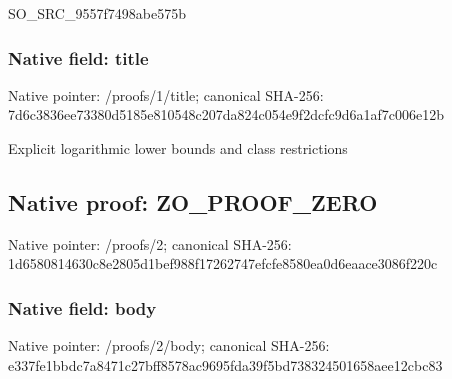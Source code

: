 \documentclass[10pt,a4paper]{article}
\begin{document}
\begingroup\raggedright\sloppy SO\_\allowbreak{}SRC\_\allowbreak{}9557f7498abe575b\par\endgroup

\subsubsection{Native field: title}
Native pointer: /proofs/1/title; canonical SHA-256: 7d6c3836ee73380d5185e810548c207da824c054e9f2dcfc9d6a1af7c006e12b

\begingroup\raggedright\sloppy Explicit logarithmic lower bounds and class restrictions\par\endgroup

\subsection{Native proof: ZO\_\allowbreak{}PROOF\_\allowbreak{}ZERO}
Native pointer: /proofs/2; canonical SHA-256: 1d6580814630c8e2805d1bef988f17262747efcfe8580ea0d6eaace3086f220c

\subsubsection{Native field: body}
Native pointer: /proofs/2/body; canonical SHA-256: e337fe1bbdc7a8471c27bff8578ac9695fda39f5bd738324501658aee12cbc83
\end{document}
